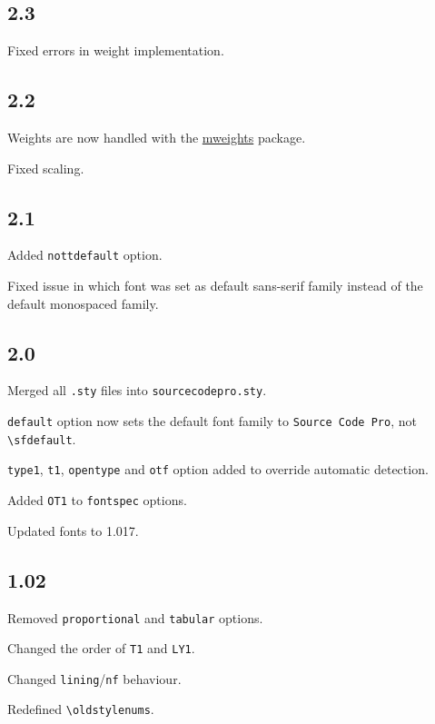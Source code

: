 \documentclass[10pt,a4paper,english]{article}
\begin{document}
\begin{multicols}{2}
\subsection*{2.3}
\begin{itemize*}
	\item Fixed errors in weight implementation.
\end{itemize*}

\subsection*{2.2}
\begin{itemize*}
	\item Weights are now handled with the \href{http://www.ctan.org/pkg/mweights}{mweights} package.
	\item Fixed scaling.
\end{itemize*}

\subsection*{2.1}
\begin{itemize*}
	\item Added \texttt{nottdefault} option.
	\item Fixed issue in which font was set as default sans-serif family instead of the default monospaced family.
\end{itemize*}

\subsection*{2.0}
\begin{itemize*}
	\item Merged all \texttt{.sty} files into \texttt{sourcecodepro.sty}.
	\item \texttt{default} option now sets the default font family to \texttt{Source Code Pro}, not \texttt{\textbackslash sfdefault}.
	\item \texttt{type1}, \texttt{t1}, \texttt{opentype} and \texttt{otf} option added to override automatic detection.
	\item Added \texttt{OT1} to \texttt{fontspec} options.
	\item Updated fonts to 1.017.
\end{itemize*}

\subsection*{1.02}
\begin{itemize*}
	\item Removed \texttt{proportional} and \texttt{tabular} options.
	\item Changed the order of \texttt{T1} and \texttt{LY1}.
	\item Changed \texttt{lining}/\texttt{nf} behaviour.
	\item Redefined \texttt{\textbackslash oldstylenums}.
\end{itemize*}


\end{multicols}
\end{document}
